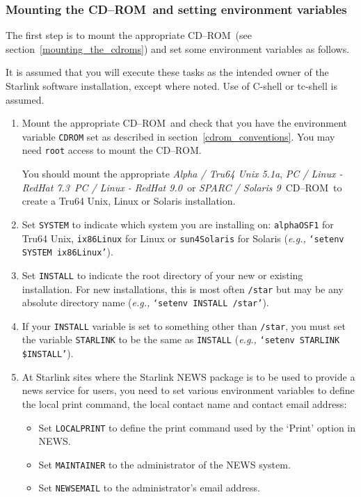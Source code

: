 \documentclass[twoside,11pt]{article}
\newcommand{\htmlref}[2]{#1}
\newcommand{\latex}[1]{#1}
\renewcommand{\_}{\texttt{\symbol{95}}}
\newcommand{\cdrom}{CD--ROM}
\newcommand{\cdrom}{CD-ROM}
\newcommand{\axp}{\textit{Alpha / Tru64 Unix 5.1a}}
\newcommand{\rha}{\textit{PC / Linux - RedHat 7.3}}
\newcommand{\rhb}{\textit{PC / Linux - RedHat 9.0}}
\newcommand{\sol}{\textit{SPARC / Solaris 9}}
\begin{document}
\subsubsection{Mounting the \cdrom\ and setting environment variables}

The first step is to \htmlref{mount}{mounting_the_cdrom} the appropriate
\cdrom\ \latex{(see section~\ref{mounting_the_cdroms})} and set
some environment variables as follows.

It is assumed that you will execute these tasks as the intended owner of
the Starlink software installation, except where noted.  Use of C-shell
or tc-shell is assumed.

\begin{enumerate}

\item Mount the appropriate \cdrom\ and check that you have the
environment variable \texttt{CDROM} set as described in
section~\ref{cdrom_conventions}.  You may need \texttt{root} access to
mount the \cdrom.

You should mount the appropriate \axp, \rha\, \rhb\ or \sol\ \cdrom\ to
create a Tru64 Unix, Linux or Solaris installation.

\item Set \texttt{SYSTEM} to indicate which system you are installing on:
\texttt{alpha\_OSF1} for Tru64 Unix, \texttt{ix86\_Linux} for Linux
or \texttt{sun4\_Solaris} for Solaris (\emph{e.g.,} \texttt{`setenv SYSTEM
ix86\_Linux'}).

\item Set \texttt{INSTALL} to indicate the root directory of your new
or existing installation.  For new installations, this is most often 
\texttt{/star} but may be any absolute directory name (\emph{e.g.,} 
\texttt{`setenv INSTALL /star'}).

\item If your \texttt{INSTALL} variable is set to something other than
\texttt{/star}, you must set the variable \texttt{STARLINK} to be the
same as \texttt{INSTALL} (\emph{e.g.,} \texttt{`setenv STARLINK \$INSTALL'}).

\item At Starlink sites where the Starlink NEWS package is to be used to
provide a news service for users, you need to set various environment
variables to define the local print command, the local contact name and
contact email address:

\begin{itemize}
\item Set \texttt{LOCALPRINT} to define the print command used by the 
`Print' option in NEWS.
\item Set \texttt{MAINTAINER} to the administrator of the NEWS system.
\item Set \texttt{NEWSEMAIL} to the administrator's email address.
\end{itemize}


\end{enumerate}
\end{document}
